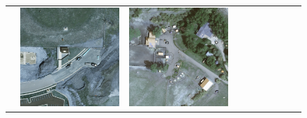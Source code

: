 \begin{figure}[H]
\begin{tabularx}{\textwidth}{c|*{9}{X}}
    & \includegraphics[trim={440pt 360pt 460pt 555pt},clip,width=\linewidth]{images/015Results/02perm_exp/comp_images/ground_truth/427.png}
    & \includegraphics[trim={740pt 420pt 180pt 510pt},clip,width=\linewidth]{images/015Results/02perm_exp/comp_images/ground_truth/523.png}

\end{tabularx}
\end{figure}
